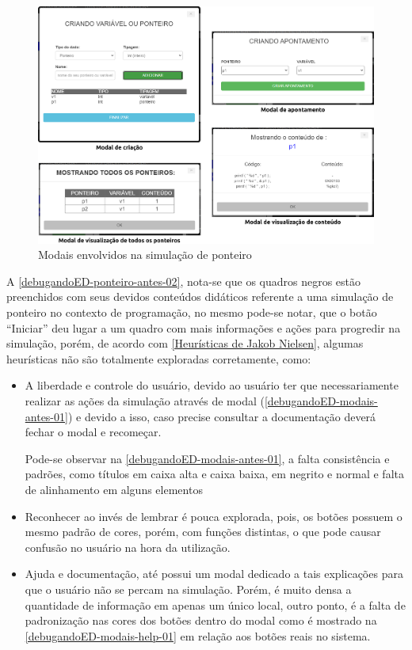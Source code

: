 \begin{figure}[htb]
    \begin{center}
	    \includegraphics[scale=0.25]{figs/debugandoED-modais-antes-01.png}
	\end{center}
    \caption{\label{debugandoED-modais-antes-01}Modais envolvidos na simulação de ponteiro}
\end{figure}

A \autoref{debugandoED-ponteiro-antes-02}, nota-se que os quadros negros estão preenchidos com seus devidos conteúdos didáticos referente a uma simulação de ponteiro no contexto de programação, no mesmo pode-se notar, que o botão “Iniciar” deu lugar a um quadro com mais informações e ações para progredir na simulação, porém, de acordo com \autoref{Heurísticas de Jakob Nielsen}, algumas heurísticas não são totalmente exploradas corretamente, como:
\begin{itemize}
    \item A liberdade e controle do usuário, devido ao usuário ter que necessariamente realizar as ações da simulação através de modal (\autoref{debugandoED-modais-antes-01}) e devido a isso, caso precise consultar a documentação deverá fechar o modal e recomeçar.
    
    Pode-se observar na \autoref{debugandoED-modais-antes-01}, a falta consistência e padrões, como títulos em caixa alta e caixa baixa, em negrito e normal e falta de alinhamento em alguns elementos

    \item Reconhecer ao invés de lembrar é pouca explorada, pois, os botões possuem o mesmo padrão de cores, porém, com funções distintas, o que pode causar confusão no usuário na hora da utilização.

    \item Ajuda e documentação, até possui um modal dedicado a tais explicações para que o usuário não se percam na simulação. Porém, é muito densa a quantidade de informação em apenas um único local, outro ponto, é a falta de padronização nas cores dos botões dentro do modal como é mostrado na \autoref{debugandoED-modais-help-01} em relação aos botões reais no sistema.

\end{itemize}

